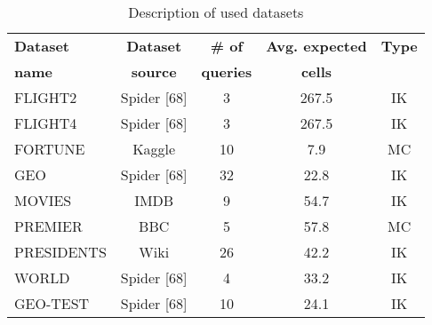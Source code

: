 \documentclass[12pt,a4paper]{article}
\begin{document}
\begin{table}[h]
\centering
\begin{tabular}{lcccc}
\toprule
\textbf{Dataset} & \textbf{Dataset} & \textbf{\# of} & \textbf{Avg. expected} & \textbf{Type} \\
\textbf{name} & \textbf{source} & \textbf{queries} & \textbf{cells} & \\
\midrule
FLIGHT2 & Spider [68] & 3 & 267.5 & IK \\
FLIGHT4 & Spider [68] & 3 & 267.5 & IK \\
FORTUNE & Kaggle & 10 & 7.9 & MC \\
GEO & Spider [68] & 32 & 22.8 & IK \\
MOVIES & IMDB & 9 & 54.7 & IK \\
PREMIER & BBC & 5 & 57.8 & MC \\
PRESIDENTS & Wiki & 26 & 42.2 & IK \\
WORLD & Spider [68] & 4 & 33.2 & IK \\



\midrule
GEO-TEST & Spider [68] & 10 & 24.1 & IK \\
\bottomrule
\end{tabular}
\caption{Description of used datasets}
\label{tab:datasets}
\end{table}
\end{document}
